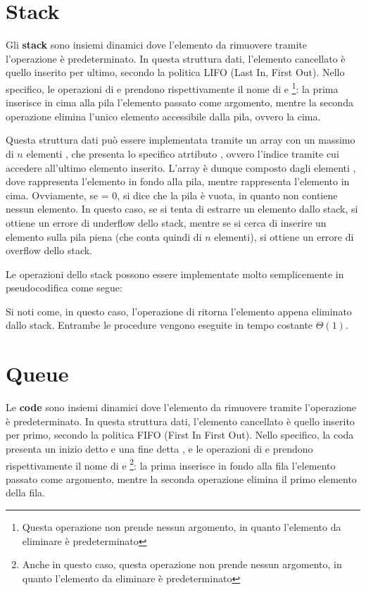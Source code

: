 \section{Stack}
Gli \textbf{stack} sono insiemi dinamici dove l'elemento da rimuovere tramite l'operazione  è predeterminato. In questa struttura dati, l'elemento cancellato è quello inserito per ultimo, secondo la politica LIFO (Last In, First Out). Nello specifico, le operazioni di  e  prendono rispettivamente il nome di  e  \footnote{Questa operazione non prende nessun argomento, in quanto l'elemento da eliminare è predeterminato}: la prima inserisce in cima alla pila l'elemento passato come argomento, mentre la seconda operazione elimina l'unico elemento accessibile dalla pila, ovvero la cima. 

Questa struttura dati può essere implementata tramite un array con un massimo di \(n\) elementi , che presenta lo specifico atrtibuto , ovvero l'indice tramite cui accedere all'ultimo elemento inserito. L'array è dunque composto dagli elementi , dove  rappresenta l'elemento in fondo alla pila, mentre  rappresenta l'elemento in cima. Ovviamente, se  = 0, si dice che la pila è vuota, in quanto non contiene nessun elemento. In questo caso, se si tenta di estrarre un elemento dallo stack, si ottiene un errore di underflow dello stack, mentre se si cerca di inserire un elemento sulla pila piena (che conta quindi di \(n\) elementi), si ottiene un errore di overflow dello stack.

Le operazioni dello stack possono essere implementate molto semplicemente in pseudocodifica come segue:




Si noti come, in questo caso, l'operazione di  ritorna l'elemento appena eliminato dallo stack. Entrambe le procedure vengono eseguite in tempo costante \(\Theta(1)\).

\section{Queue}
Le \textbf{code} sono insiemi dinamici dove l'elemento da rimuovere tramite l'operazione  è predeterminato. In questa struttura dati, l'elemento cancellato è quello inserito per primo, secondo la politica FIFO (First In First Out). Nello specifico, la coda presenta un inizio detto  e una fine detta , e le operazioni di  e  prendono rispettivamente il nome di  e  \footnote{Anche in questo caso, questa operazione non prende nessun argomento, in quanto l'elemento da eliminare è predeterminato}: la prima inserisce in fondo alla fila l'elemento passato come argomento, mentre la seconda operazione elimina il primo elemento della fila. 

